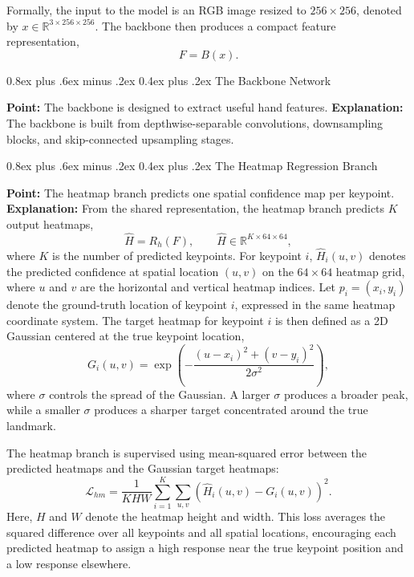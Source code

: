 \documentclass[10pt,letterpaper]{article}
\makeatletter
\renewcommand\subsubsection{\@startsection{subsubsection}{3}{\z@}%
  {0.8ex plus .6ex minus .2ex}%
  {0.4ex plus .2ex}%
  {\normalfont\small\itshape}}
\makeatother
\begin{document}
Formally, the input to the model is an RGB image resized to $256 \times 256$, denoted by $x \in \mathbb{R}^{3 \times 256 \times 256}$. The backbone then produces a compact feature representation,
\[
F = B(x).
\]

\subsubsection{The Backbone Network}

\noindent\textbf{Point:} The backbone is designed to extract useful hand features.  
\textbf{Explanation:} The backbone is built from depthwise-separable convolutions, downsampling blocks, and skip-connected upsampling stages.

\subsubsection{The Heatmap Regression Branch}

\noindent\textbf{Point:} The heatmap branch predicts one spatial confidence map per keypoint.  
\textbf{Explanation:} From the shared representation, the heatmap branch predicts \(K\) output heatmaps,
\[
\hat{H} = R_h(F), \qquad \hat{H} \in \mathbb{R}^{K \times 64 \times 64},
\]
where \(K\) is the number of predicted keypoints. For keypoint \(i\), \(\hat{H}_i(u,v)\) denotes the predicted confidence at spatial location \((u,v)\) on the \(64 \times 64\) heatmap grid, where \(u\) and \(v\) are the horizontal and vertical heatmap indices. Let \(p_i = (x_i, y_i)\) denote the ground-truth location of keypoint \(i\), expressed in the same heatmap coordinate system. The target heatmap for keypoint \(i\) is then defined as a 2D Gaussian centered at the true keypoint location,
\[
G_i(u,v) = \exp\left(
-\frac{(u-x_i)^2 + (v-y_i)^2}{2\sigma^2}
\right),
\]
where \(\sigma\) controls the spread of the Gaussian. A larger \(\sigma\) produces a broader peak, while a smaller \(\sigma\) produces a sharper target concentrated around the true landmark.

The heatmap branch is supervised using mean-squared error between the predicted heatmaps and the Gaussian target heatmaps:
\[
\mathcal{L}_{hm}
=
\frac{1}{KHW}
\sum_{i=1}^{K}
\sum_{u,v}
\left(\hat{H}_i(u,v) - G_i(u,v)\right)^2.
\]
Here, \(H\) and \(W\) denote the heatmap height and width. This loss averages the squared difference over all keypoints and all spatial locations, encouraging each predicted heatmap to assign a high response near the true keypoint position and a low response elsewhere. 
\end{document}
